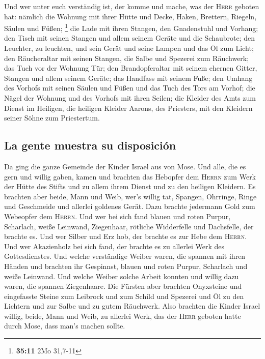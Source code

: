  Und wer unter euch verständig ist, der komme und mache,
was der \textsc{Herr} geboten hat:  nämlich die Wohnung
mit ihrer Hütte und Decke, Haken, Brettern, Riegeln, Säulen und Füßen;
\footnote{\textbf{35:11} 2Mo 31,7-11}  die Lade mit ihren
Stangen, den Gnadenstuhl und Vorhang;  den Tisch mit
seinen Stangen und allem seinem Geräte und die Schaubrote;
 den Leuchter, zu leuchten, und sein Gerät und seine
Lampen und das Öl zum Licht;  den Räucheraltar mit seinen
Stangen, die Salbe und Spezerei zum Räuchwerk; das Tuch vor der Wohnung
Tür;  den Brandopferaltar mit seinem ehernen Gitter,
Stangen und allem seinem Geräte; das Handfass mit seinem Fuße;
 den Umhang des Vorhofs mit seinen Säulen und Füßen und
das Tuch des Tors am Vorhof;  die Nägel der Wohnung und
des Vorhofs mit ihren Seilen;  die Kleider des Amts zum
Dienst im Heiligen, die heiligen Kleider Aarons, des Priesters, mit den
Kleidern seiner Söhne zum Priestertum.

\hypertarget{la-gente-muestra-su-disposiciuxf3n}{%
\subsection{La gente muestra su
disposición}\label{la-gente-muestra-su-disposiciuxf3n}}

 Da ging die ganze Gemeinde der Kinder Israel aus von
Mose.  Und alle, die es gern und willig gaben, kamen und
brachten das Hebopfer dem \textsc{Herrn} zum Werk der Hütte des Stifts
und zu allem ihrem Dienst und zu den heiligen Kleidern. 
Es brachten aber beide, Mann und Weib, wer's willig tat, Spangen,
Ohrringe, Ringe und Geschmeide und allerlei goldenes Gerät. Dazu brachte
jedermann Gold zum Webeopfer dem \textsc{Herrn}.  Und wer
bei sich fand blauen und roten Purpur, Scharlach, weiße Leinwand,
Ziegenhaar, rötliche Widderfelle und Dachsfelle, der brachte es.
 Und wer Silber und Erz hob, der brachte es zur Hebe dem
\textsc{Herrn}. Und wer Akazienholz bei sich fand, der brachte es zu
allerlei Werk des Gottesdienstes.  Und welche verständige
Weiber waren, die spannen mit ihren Händen und brachten ihr Gespinnst,
blauen und roten Purpur, Scharlach und weiße Leinwand. 
Und welche Weiber solche Arbeit konnten und willig dazu waren, die
spannen Ziegenhaare.  Die Fürsten aber brachten
Onyxsteine und eingefasste Steine zum Leibrock und zum Schild
 und Spezerei und Öl zu den Lichtern und zur Salbe und zu
gutem Räuchwerk.  Also brachten die Kinder Israel willig,
beide, Mann und Weib, zu allerlei Werk, das der \textsc{Herr} geboten
hatte durch Mose, dass man's machen sollte.

